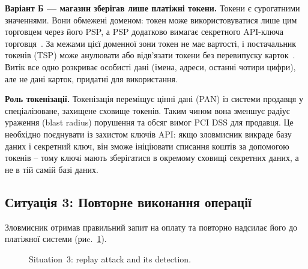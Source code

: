 \textbf{Варіант Б — магазин зберігав лише платіжні токени.} Токени є сурогатними значеннями. Вони обмежені 
доменом: токен може використовуватися лише цим торговцем через його PSP, а PSP додатково вимагає секретного API-ключа 
торговця~\cite{emv_tokenisation_qrg}. За межами цієї доменної зони токен не має вартості, і постачальник токенів 
(TSP) може анулювати або відв'язати токени без перевипуску карток~\cite{emv_tokenisation}. Витік все одно розкриває 
особисті дані (імена, адреси, останні чотири цифри), але не дані карток, придатні для використання. 

\textbf{Роль токенізації.} Токенізація переміщує цінні дані (PAN) із системи продавця у спеціалізоване, захищене 
сховище токенів. Таким чином вона зменшує радіус ураження (blast radius) порушення та обсяг вимог PCI DSS для продавця. Це 
необхідно поєднувати із захистом ключів API: якщо зловмисник викраде базу даних і секретний ключ, він зможе ініціювати 
списання коштів за допомогою токенів -- тому ключі мають зберігатися в окремому сховищі секретних даних, а не в 
тій самій базі даних.

\subsection{Ситуація 3: Повторне виконання операції}
\label{sec:s3}

Зловмисник отримав правильний запит на оплату та повторно надсилає його до платіжної системи (риc.~\ref{fig:s3}).

\begin{figure}[H]
    \centering
    \caption{Situation~3: replay attack and its detection.}
    \label{fig:s3}
\end{figure}

